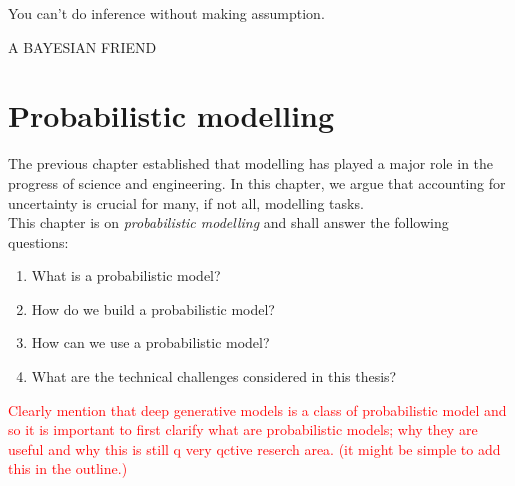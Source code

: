 {\centering
\parbox{\textwidth}{%
  \raggedright{\itshape%

  You can't do inference without making assumption.\par\bigskip
  }
  \raggedleft\MakeUppercase{A Bayesian friend}\par%
}}

\chapter{Probabilistic modelling}\label{ch:02}

\begin{chapter_outline}

  The previous chapter established that modelling has played a major role in the progress of science and engineering.
  In this chapter, we argue that accounting for uncertainty is crucial for many, if not all, modelling tasks.
  \\
  This chapter is on \textit{probabilistic modelling} and shall answer the following questions:
  \begin{enumerate}
    \item What is a probabilistic model?
    \item How do we build a probabilistic model?
    \item How can we use a probabilistic model?
    \item What are the technical challenges considered in this thesis?
  \end{enumerate}

\end{chapter_outline}

\textcolor{red}{Clearly mention that deep generative models is a class of probabilistic model and so it is important to first clarify what are probabilistic models; why they are useful and why this is still q very qctive reserch area. (it might be simple to add this in the outline.)}

